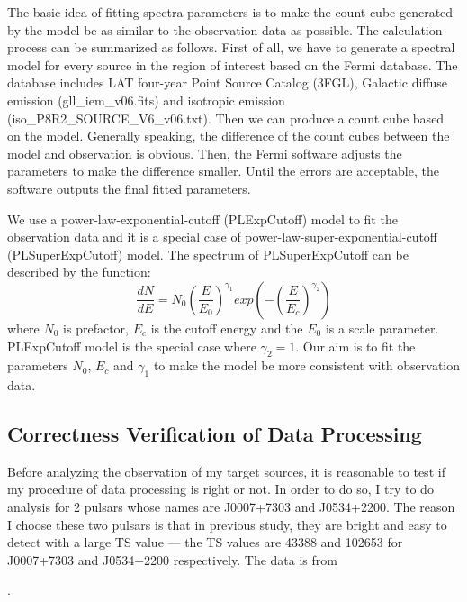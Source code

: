 \documentclass[12pt]{report}
\newcommand{\blackhref}[2]{
  \href{#1}{\color{black}{\textit{\small #2}}}
}
\begin{document}
        The basic idea of fitting spectra parameters is to make the count cube generated by the model be as similar 
        to the observation data as possible. The calculation process can be summarized as follows. First of all, we 
        have to generate a spectral model for every source in the region of interest based on the Fermi database.
        The database includes LAT four-year Point Source Catalog (3FGL), Galactic diffuse emission (gll\_iem\_v06.fits)
        and isotropic emission (iso\_P8R2\_SOURCE\_V6\_v06.txt). 
        Then we can produce a count cube based on the model. Generally speaking, the difference of the 
        count cubes between the model and observation is obvious. Then, the Fermi software adjusts the parameters 
        to make the difference smaller. Until the errors are acceptable, the software outputs the final fitted 
        parameters.  

        We use a power-law-exponential-cutoff (PLExpCutoff) model to fit the observation data and 
        it is a special case of power-law-super-exponential-cutoff (PLSuperExpCutoff) model. 
        The spectrum of PLSuperExpCutoff can be described by the function: 
            \begin{equation} 
              \label{eq: fermi_model}
              \frac{dN}{dE} = N_{0} \left(\frac{E}{E_0}\right)^{\gamma_1} 
              exp\left(-\left(\frac{E}{E_c}\right)^{\gamma_2}\right)
            \end{equation}
        where $N_0$ is prefactor, $E_c$ is the cutoff energy and the $E_0$ is a scale parameter. 
        PLExpCutoff model is the special case where $\gamma_2=1$. Our aim is to fit the parameters 
        $N_0$, $E_c$ and $\gamma_1$ to make the model be more consistent with observation data.

        \subsection{Correctness Verification of Data Processing}
            Before analyzing the observation of my target sources, it is reasonable to test if my procedure of 
            data processing is right or not. In order to do so, I try to do analysis for 
            2 pulsars whose names are J0007+7303 and J0534+2200. The reason I choose these two pulsars 
            is that in previous study, they are bright and easy to detect with a large TS value --- 
            the TS values are 43388 and 102653 for J0007+7303 and J0534+2200 respectively. The data is from 
            \blackhref{https://arxiv.org/abs/1305.4385}{this paper}. 
\end{document}
